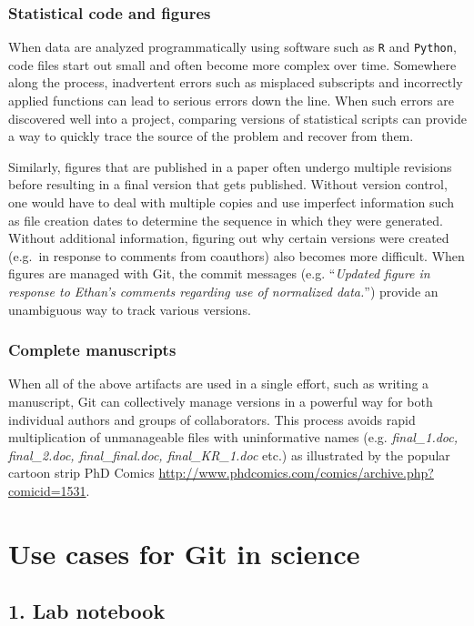\documentclass[]{article}
\begin{document}
\subsubsection{Statistical code and figures}

When data are analyzed programmatically using software such as
\texttt{R} and \texttt{Python}, code files start out small and often
become more complex over time. Somewhere along the process, inadvertent
errors such as misplaced subscripts and incorrectly applied functions
can lead to serious errors down the line. When such errors are
discovered well into a project, comparing versions of statistical
scripts can provide a way to quickly trace the source of the problem and
recover from them.

Similarly, figures that are published in a paper often undergo multiple
revisions before resulting in a final version that gets published.
Without version control, one would have to deal with multiple copies and
use imperfect information such as file creation dates to determine the
sequence in which they were generated. Without additional information,
figuring out why certain versions were created (e.g.~in response to
comments from coauthors) also becomes more difficult. When figures are
managed with Git, the commit messages (e.g. ``\emph{Updated figure in
response to Ethan's comments regarding use of normalized data.}'')
provide an unambiguous way to track various versions.

\subsubsection{Complete manuscripts}

When all of the above artifacts are used in a single effort, such as
writing a manuscript, Git can collectively manage versions in a powerful
way for both individual authors and groups of collaborators. This
process avoids rapid multiplication of unmanageable files with
uninformative names (e.g. \emph{final\_1.doc, final\_2.doc,
final\_final.doc, final\_KR\_1.doc} etc.) as illustrated by the popular
cartoon strip PhD Comics
\url{http://www.phdcomics.com/comics/archive.php?comicid=1531}.

\section{Use cases for Git in science}

\subsection{1. Lab notebook}
\end{document}
